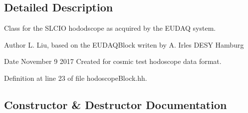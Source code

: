 \subsection{Detailed Description}
Class for the SLCIO hododscope as acquired by the EUDAQ system. \begin{DoxyAuthor}{Author}
L. Liu, based on the EUDAQBlock writen by A. Irles DESY Hamburg 
\end{DoxyAuthor}
\begin{DoxyDate}{Date}
November 9 2017 Created for cosmic test hodoscope data format. 
\end{DoxyDate}


Definition at line 23 of file hodoscopeBlock.hh.

\subsection{Constructor \& Destructor Documentation}

